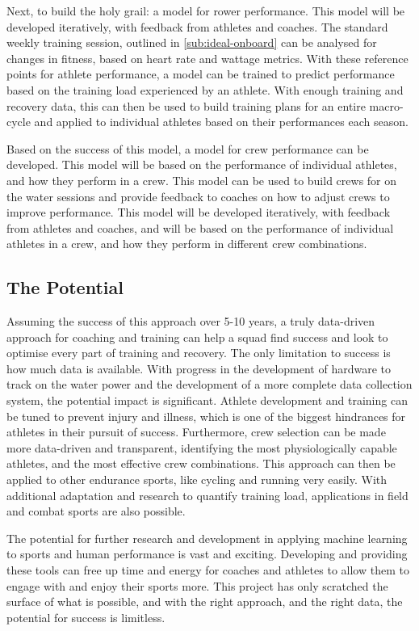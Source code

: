 Next, to build the holy grail: a model for rower performance. This model will be developed iteratively, with feedback from athletes and coaches. The standard weekly training session, outlined in \autoref{sub:ideal-onboard} can be analysed for changes in fitness, based on heart rate and wattage metrics. With these reference points for athlete performance, a model can be trained to predict performance based on the training load experienced by an athlete. With enough training and recovery data, this can then be used to build training plans for an entire macro-cycle and applied to individual athletes based on their performances each season. 

Based on the success of this model, a model for crew performance can be developed. This model will be based on the performance of individual athletes, and how they perform in a crew. This model can be used to build crews for on the water sessions and provide feedback to coaches on how to adjust crews to improve performance. This model will be developed iteratively, with feedback from athletes and coaches, and will be based on the performance of individual athletes in a crew, and how they perform in different crew combinations.

\subsection{The Potential}
Assuming the success of this approach over 5-10 years, a truly data-driven approach for coaching and training can help a squad find success and look to optimise every part of training and recovery. The only limitation to success is how much data is available. With progress in the development of hardware to track on the water power and the development of a more complete data collection system, the potential impact is significant. Athlete development and training can be tuned to prevent injury and illness, which is one of the biggest hindrances for athletes in their pursuit of success. Furthermore, crew selection can be made more data-driven and transparent, identifying the most physiologically capable athletes, and the most effective crew combinations. This approach can then be applied to other endurance sports, like cycling and running very easily. With additional adaptation and research to quantify training load, applications in field and combat sports are also possible.

The potential for further research and development in applying machine learning to sports and human performance is vast and exciting. Developing and providing these tools can free up time and energy for coaches and athletes to allow them to engage with and enjoy their sports more. This project has only scratched the surface of what is possible, and with the right approach, and the right data, the potential for success is limitless.

